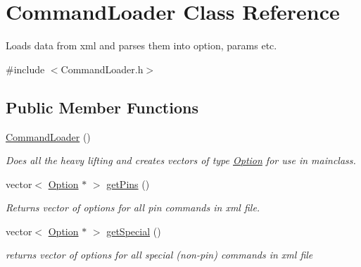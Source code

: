 \hypertarget{class_command_loader}{
\section{CommandLoader Class Reference}
\label{class_command_loader}
}


Loads data from xml and parses them into option, params etc.  




{\ttfamily \#include $<$CommandLoader.h$>$}

\subsection*{Public Member Functions}
\begin{DoxyCompactItemize}
\item 
\hypertarget{class_command_loader_a48bd8d411362120ccab920e7aadb5967}{
\hyperlink{class_command_loader_a48bd8d411362120ccab920e7aadb5967}{CommandLoader} ()}
\label{class_command_loader_a48bd8d411362120ccab920e7aadb5967}

\begin{DoxyCompactList}\small\item\em Does all the heavy lifting and creates vectors of type \hyperlink{class_option}{Option} for use in mainclass. \end{DoxyCompactList}\item 
\hypertarget{class_command_loader_ac734716a59e293da109fc29af120f2aa}{
vector$<$ \hyperlink{class_option}{Option} $\ast$ $>$ \hyperlink{class_command_loader_ac734716a59e293da109fc29af120f2aa}{getPins} ()}
\label{class_command_loader_ac734716a59e293da109fc29af120f2aa}

\begin{DoxyCompactList}\small\item\em Returns vector of options for all pin commands in xml file. \end{DoxyCompactList}\item 
\hypertarget{class_command_loader_ac7eeaf07d2844ffaf09bc87d1cd96bb0}{
vector$<$ \hyperlink{class_option}{Option} $\ast$ $>$ \hyperlink{class_command_loader_ac7eeaf07d2844ffaf09bc87d1cd96bb0}{getSpecial} ()}
\label{class_command_loader_ac7eeaf07d2844ffaf09bc87d1cd96bb0}

\begin{DoxyCompactList}\small\item\em returns vector of options for all special (non-\/pin) commands in xml file \end{DoxyCompactList}\end{DoxyCompactItemize}


